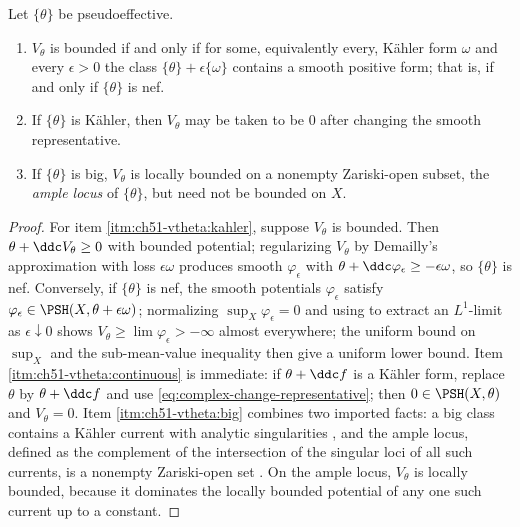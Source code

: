 \begin{proposition}\label{prop:ch51-vtheta-bounded-iff}
Let \(\{\theta\}\) be pseudoeffective.
\begin{enumerate}
\item\label{itm:ch51-vtheta:kahler}
      \(V_\theta\) is bounded if and only if for some, equivalently every,
      K\"ahler form \(\omega\) and every \(\epsilon>0\) the class
      \(\{\theta\}+\epsilon\{\omega\}\) contains a smooth positive form;
      that is, if and only if \(\{\theta\}\) is nef.
\item\label{itm:ch51-vtheta:continuous}
      If \(\{\theta\}\) is K\"ahler, then \(V_\theta\) may be taken to be
      \(0\) after changing the smooth representative.
\item\label{itm:ch51-vtheta:big}
      If \(\{\theta\}\) is big, \(V_\theta\) is locally bounded on a
      nonempty Zariski-open subset, the \emph{ample locus} of
      \(\{\theta\}\), but need not be bounded on \(X\).
\end{enumerate}
\end{proposition}

\begin{proof}
For item \cref{itm:ch51-vtheta:kahler}, suppose \(V_\theta\) is bounded.
Then \(\theta+\ddc V_\theta\geq0\) with bounded potential; regularizing
\(V_\theta\) by Demailly's approximation with loss \(\epsilon\omega\)
produces smooth \(\varphi_\epsilon\) with
\(\theta+\ddc\varphi_\epsilon\geq-\epsilon\omega\), so \(\{\theta\}\) is
nef.  Conversely, if \(\{\theta\}\) is nef, the smooth potentials
\(\varphi_\epsilon\) satisfy
\(\varphi_\epsilon\in\PSH(X,\theta+\epsilon\omega)\); normalizing
\(\sup_X\varphi_\epsilon=0\) and using
 to extract an \(L^1\)-limit as
\(\epsilon\downarrow0\) shows \(V_\theta\geq\lim\varphi_\epsilon>-\infty\)
almost everywhere; the uniform bound on \(\sup_X\) and the sub-mean-value
inequality then give a uniform lower bound.  Item
\cref{itm:ch51-vtheta:continuous} is immediate: if
\(\theta+\ddc f\) is a K\"ahler form, replace \(\theta\) by
\(\theta+\ddc f\) and use \eqref{eq:complex-change-representative}; then
\(0\in\PSH(X,\theta)\) and \(V_\theta=0\).  Item
\cref{itm:ch51-vtheta:big} combines two imported facts: a big class
contains a K\"ahler current with analytic singularities
\cite{Dem92reg,DPS01}, and the ample locus, defined as the complement of
the intersection of the singular loci of all such currents, is a nonempty
Zariski-open set \cite{Bou04}.  On the ample locus, \(V_\theta\) is
locally bounded, because it dominates the locally bounded potential of any
one such current up to a constant.
\end{proof}

